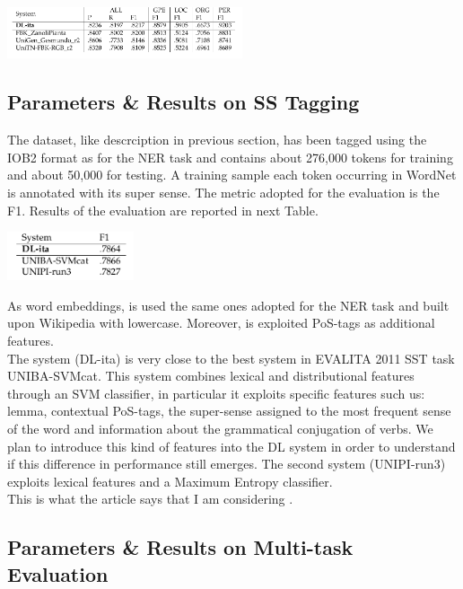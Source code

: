 \documentclass[twocolumn,10pt]{wmrDoc}
\begin{document}
\vskip 0.5cm
\includegraphics[width=0.52\textwidth]{figure/nerresult.png}
\vskip0.5cm

\subsection{Parameters \& Results on SS Tagging}
The dataset, like descrciption in previous section, has been tagged using the IOB2 format as for the NER task and contains about 276,000 tokens for training and about 50,000 for testing. A training
sample each token occurring in WordNet is annotated with its super sense. The metric adopted for the evaluation is the F1. Results of the evaluation are reported in next Table.

\vskip 0.5cm
\includegraphics[width=0.28\textwidth]{figure/sstresult.png}
\vskip0.5cm

As word embeddings, is used the same ones adopted for the NER task and built upon Wikipedia with lowercase. Moreover, is exploited PoS-tags as additional features.\\
The system (DL-ita) is very close to the best system in EVALITA 2011 SST task UNIBA-SVMcat. 
This system combines lexical and distributional features through an SVM classifier, in particular it exploits specific features such us: lemma, contextual PoS-tags, the super-sense assigned to the most frequent sense of the word and information about the grammatical conjugation of verbs. We plan to introduce this kind of features into the DL system in order to understand if this difference in performance still emerges.
The second system (UNIPI-run3) exploits lexical features and a Maximum Entropy classifier.\\
This is what the article says that I am considering \cite{DBLP:conf/clic-it/BasileSC17}.


\subsection{Parameters \& Results on Multi-task Evaluation}
\end{document}

